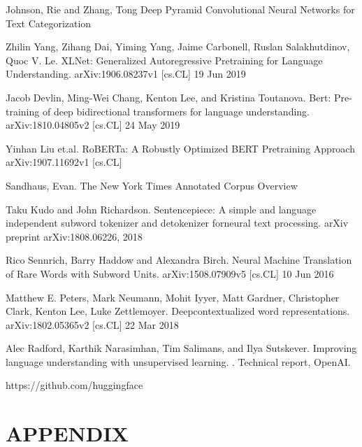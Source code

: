 \documentclass{article}
\begin{document}
\newpage
\begin{thebibliography}{1}
Johnson, Rie  and Zhang, Tong
\newblock Deep Pyramid Convolutional Neural Networks for Text Categorization

Zhilin Yang, Zihang Dai, Yiming Yang, Jaime Carbonell, Ruslan Salakhutdinov, Quoc V. Le. 
\newblock XLNet: Generalized Autoregressive Pretraining for Language Understanding. 
\newblock arXiv:1906.08237v1 [cs.CL] 19 Jun 2019

Jacob Devlin, Ming-Wei Chang, Kenton Lee, and Kristina Toutanova. 
\newblock Bert: Pre-training of
deep bidirectional transformers for language understanding.
\newblock arXiv:1810.04805v2 [cs.CL] 24 May 2019

Yinhan Liu et.al. 
\newblock RoBERTa: A Robustly Optimized BERT Pretraining Approach 
\newblock arXiv:1907.11692v1 [cs.CL]

Sandhaus, Evan. 
\newblock The New York Times Annotated Corpus Overview

Taku Kudo and John Richardson. 
\newblock Sentencepiece: A simple and language independent subword tokenizer and detokenizer forneural text processing. 
\newblock arXiv preprint arXiv:1808.06226, 2018

Rico  Sennrich,  Barry  Haddow  and  Alexandra  Birch.   
\newblock Neural  Machine  Translation  of  Rare  Words  with  Subword  Units.
\newblock arXiv:1508.07909v5 [cs.CL] 10 Jun 2016

Matthew E. Peters, Mark Neumann, Mohit Iyyer, Matt Gardner, Christopher Clark, Kenton Lee, Luke Zettlemoyer.  
\newblock Deepcontextualized word representations. 
\newblock arXiv:1802.05365v2 [cs.CL] 22 Mar 2018

Alec  Radford,  Karthik  Narasimhan,  Tim  Salimans,  and  Ilya  Sutskever.  
\newblock Improving  language  understanding  with unsupervised learning. 
.  Technical report, OpenAI.

https://github.com/huggingface


\end{thebibliography}

\newpage
\section{APPENDIX}
\end{document}
